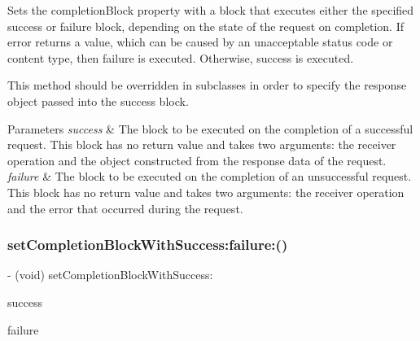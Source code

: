 Sets the {\ttfamily completion\+Block} property with a block that executes either the specified success or failure block, depending on the state of the request on completion. If {\ttfamily error} returns a value, which can be caused by an unacceptable status code or content type, then {\ttfamily failure} is executed. Otherwise, {\ttfamily success} is executed.

This method should be overridden in subclasses in order to specify the response object passed into the success block.


\begin{DoxyParams}{Parameters}
{\em success} & The block to be executed on the completion of a successful request. This block has no return value and takes two arguments\+: the receiver operation and the object constructed from the response data of the request. \\
\hline
{\em failure} & The block to be executed on the completion of an unsuccessful request. This block has no return value and takes two arguments\+: the receiver operation and the error that occurred during the request. \\
\hline
\end{DoxyParams}
\mbox{\label{interface_a_f_h_t_t_p_request_operation_a3b816391726dade9cfc9cbc11cc352d6}} 
\subsubsection{\texorpdfstring{set\+Completion\+Block\+With\+Success\+:failure\+:()}{setCompletionBlockWithSuccess:failure:()}\hspace{0.1cm}{\footnotesize\ttfamily [3/3]}}
{\footnotesize\ttfamily -\/ (void) set\+Completion\+Block\+With\+Success\+: \begin{DoxyParamCaption}\item[{(nullable void($^\wedge$)(\mbox{\hyperlink{interface_a_f_h_t_t_p_request_operation}{A\+F\+H\+T\+T\+P\+Request\+Operation}} $\ast$operation, id \mbox{\hyperlink{interface_a_f_h_t_t_p_request_operation_a7418f7784dcaf21623ce588fb27734c3}{response\+Object}}))}]{success }\item[{failure:(nullable void($^\wedge$)(\mbox{\hyperlink{interface_a_f_h_t_t_p_request_operation}{A\+F\+H\+T\+T\+P\+Request\+Operation}} $\ast$operation, N\+S\+Error $\ast$\mbox{\hyperlink{interface_a_f_u_r_l_connection_operation_a51f90be47e7f7577b979aae1aa597070}{error}}))}]{failure }\end{DoxyParamCaption}}

